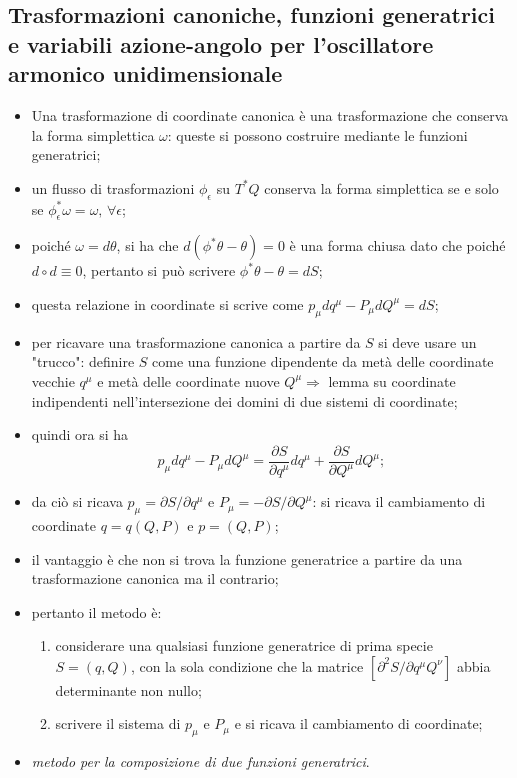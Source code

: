 \documentclass{article}
\theoremstyle{remark}
\begin{document}
\subsection{Trasformazioni canoniche, funzioni generatrici e variabili azione-angolo per l'oscillatore armonico unidimensionale}
\begin{itemize}
    \item Una trasformazione di coordinate canonica è una trasformazione che conserva la forma simplettica $\omega$: queste si possono costruire mediante le funzioni generatrici;
    \item un flusso di trasformazioni $\phi_\epsilon$ su $T^*Q$ conserva la forma simplettica se e solo se $\phi_\epsilon^*\omega=\omega,\,\forall\epsilon$;
    \item poiché $\omega=d\theta$, si ha che $d(\phi^*\theta-\theta)=0$ è una forma chiusa dato che poiché $d\circ d\equiv0$, pertanto si può scrivere $\phi^*\theta-\theta=dS$;
    \item questa relazione in coordinate si scrive come $p_\mu dq^\mu-P_\mu dQ^\mu=dS$;
    \item per ricavare una trasformazione canonica a partire da $S$ si deve usare un "trucco": definire $S$ come una funzione dipendente da metà delle coordinate vecchie $q^\mu$ e metà delle coordinate nuove $Q^\mu\Rightarrow$ lemma su coordinate indipendenti nell'intersezione dei domini di due sistemi di coordinate;
    \item quindi ora si ha
    \begin{equation}
        p_\mu dq^\mu-P_\mu dQ^\mu=\frac{\partial S}{\partial q^\mu}dq^\mu+\frac{\partial S}{\partial Q^\mu}dQ^\mu;
    \end{equation}
    \item da ciò si ricava $p_\mu=\partial S/\partial q^\mu$ e $P_\mu=-\partial S/\partial Q^\mu$: si ricava il cambiamento di coordinate $q=q(Q,P)$ e $p=(Q,P)$;
    \item il vantaggio è che non si trova la funzione generatrice a partire da una trasformazione canonica ma il contrario;
    \item pertanto il metodo è:
    \begin{enumerate}
        \item considerare una qualsiasi funzione generatrice di prima specie $S=(q,Q)$, con la sola condizione che la matrice $[\partial^2S/\partial q^\mu Q^\nu]$ abbia determinante non nullo;
        \item scrivere il sistema di $p_\mu$ e $P_\mu$ e si ricava il cambiamento di coordinate;
    \end{enumerate}
    \item \textit{metodo per la composizione di due funzioni generatrici}.
\end{itemize}
\end{document}
